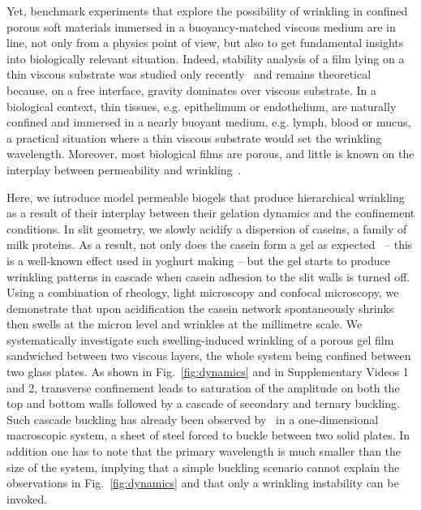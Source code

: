 \documentclass[twocolumn,superscriptaddress,showpacs,preprintnumbers,
amsmath,amssymb,prl]{revtex4-1}
\begin{document}


Yet, benchmark experiments that explore the possibility of wrinkling in confined porous soft materials immersed in a buoyancy-matched viscous medium are in line, not only from a physics point of view, but also to get fundamental insights into biologically relevant situation. Indeed, stability analysis of a film lying on a thin viscous substrate was studied only recently~\cite{Huang2002} and remains theoretical because, on a free interface, gravity dominates over viscous substrate. In a biological context, thin tissues, e.g. epithelimum or endothelium, are naturally confined and immersed in a nearly buoyant medium, e.g. lymph, blood or mucus, a practical situation where a thin viscous substrate would set the wrinkling wavelength. Moreover, most biological films are porous, and little is known on the interplay between permeability and wrinkling~\cite{Ma2004,Longley2013}.

Here, we introduce model permeable biogels that produce hierarchical wrinkling as a result of their interplay between their gelation dynamics and the confinement conditions. In slit geometry, we slowly acidify a dispersion of caseins, a family of milk proteins. As a result, not only does the casein form a gel as expected~\cite{Roefs1986,Bremer1989} -- this is a well-known effect used in yoghurt making -- but the gel starts to produce wrinkling patterns in cascade when casein adhesion to the slit walls is turned off. Using a combination of rheology, light microscopy and confocal microscopy, we demonstrate that upon acidification the casein network spontaneously shrinks then swells at the micron level and wrinkles at the millimetre scale. We systematically investigate such swelling-induced wrinkling of a porous gel film sandwiched between two viscous layers, the whole system being confined between two glass plates. As shown in Fig.~\ref{fig:dynamics} and in Supplementary Videos 1 and 2, transverse confinement leads to saturation of the amplitude on both the top and bottom walls followed by a cascade of secondary and ternary buckling. Such cascade buckling has already been observed by~\cite{Roman1999} in a one-dimensional macroscopic system, a sheet of steel forced to buckle between two solid plates. In addition one has to note that the primary wavelength is much smaller than the size of the system, implying that a simple buckling scenario cannot explain the observations in Fig.~\ref{fig:dynamics} and that only a wrinkling instability can be invoked. 
\end{document}
